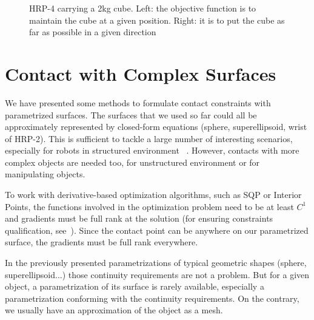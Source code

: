 \begin{figure}
\centering
  \centering
  \setlength\fboxsep{0pt}
  \setlength\fboxrule{1pt}
\caption{HRP-4 carrying a 2kg cube.
Left: the objective function is to maintain the cube at a given position.
Right: it is to put the cube as far as possible in a given direction}
\label{fig:hrp4_cube}
\end{figure}

\section{Contact with Complex Surfaces}
\label{sec:contact_with_complex_surfaces}

We have presented some methods to formulate contact constraints with parametrized surfaces.
The surfaces that we used so far could all be approximately represented by closed-form equations (sphere, superellipsoid, wrist of HRP-2).
This is sufficient to tackle a large number of interesting scenarios, especially for robots in structured environment~\cite{vaillant:humanoids:2014} \cite{vaillant:autonomousrobots:2016}.
However, contacts with more complex objects are needed too, for unstructured environment or for manipulating objects.

To work with derivative-based optimization algorithms, such as SQP or Interior Points, the functions involved in the optimization problem need to be at least $C^1$ and gradients must be full rank at the solution (for ensuring constraints qualification, see~\cite{nocedal:book:2006}).
Since the contact point can be anywhere on our parametrized surface, the gradients must be full rank everywhere.

In the previously presented parametrizations of typical geometric shapes (sphere, superellipsoid...) those continuity requirements are not a problem.
But for a given object, a parametrization of its surface is rarely available, especially a parametrization conforming with the continuity requirements.
On the contrary, we usually have an approximation of the object as a mesh.

